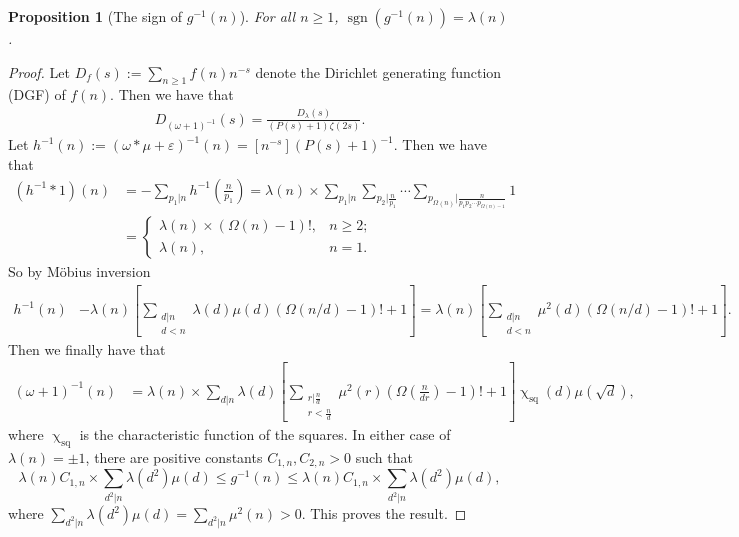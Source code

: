 \documentclass[11pt,reqno,a4letter]{article}
\numberwithin{figure}{section}
\numberwithin{table}{section}
\renewcommand{\chi}{\upchi}
\theoremstyle{plain}
\newtheorem{prop}[theorem]{Proposition}
\numberwithin{theorem}{section}
\theoremstyle{definition}
\begin{document}
\begin{prop}[The sign of $g^{-1}(n)$]
\label{prop_SignageDirInvsOfPosBddArithmeticFuncs_v1} 
For all $n \geq 1$, $\operatorname{sgn}(g^{-1}(n)) = \lambda(n)$. 
\end{prop} 
\begin{proof} 
Let $D_f(s) := \sum_{n \geq 1} f(n) n^{-s}$ denote the Dirichlet generating function (DGF) of $f(n)$. 
Then we have that 
\begin{align*} 
D_{(\omega+1)^{-1}}(s) = \frac{D_{\lambda}(s)}{(P(s)+1) \zeta(2s)}. 
\end{align*} 
Let $h^{-1}(n) := (\omega \ast \mu + \varepsilon)^{-1}(n) = [n^{-s}](P(s) + 1)^{-1}$. 
Then we have that 
\begin{align*} 
(h^{-1} \ast 1)(n) & = - \sum_{p_1|n} h^{-1}\left(\frac{n}{p_1}\right) 
     = \lambda(n) \times \sum_{p_1|n} \sum_{p_2|\frac{n}{p_1}} \cdots \sum_{p_{\Omega(n)} | 
     \frac{n}{p_1p_2\cdots p_{\Omega(n)-1}}} 1 \\ 
     & = \begin{cases} 
     \lambda(n) \times (\Omega(n) - 1)!, & n \geq 2; \\ 
     \lambda(n), & n=1. 
     \end{cases} 
\end{align*} 
So by M\"obius inversion 
\begin{align*} 
h^{-1}(n) & - \lambda(n) \left[\sum_{\substack{d|n \\ d<n}} \lambda(d) \mu(d) (\Omega(n/d)-1)! + 1\right] 
     = \lambda(n) \left[\sum_{\substack{d|n \\ d<n}} \mu^2(d) (\Omega(n/d)-1)! + 1\right]. 
\end{align*} 
Then we finally have that 
\begin{align*} 
(\omega+1)^{-1}(n) & = \lambda(n) \times \sum_{d|n} \lambda(d) 
     \left[\sum_{\substack{r|\frac{n}{d} \\ r < \frac{n}{d}}}  \mu^2(r) (\Omega\left(\frac{n}{dr}\right)-1)!+ 1\right] 
     \chi_{\operatorname{sq}}(d) \mu(\sqrt{d}), 
\end{align*} 
where $\chi_{\operatorname{sq}}$ is the characteristic function of the squares. 
In either case of $\lambda(n) = \pm 1$, there are positive constants $C_{1,n},C_{2,n} > 0$ such that 
\[
\lambda(n) C_{1,n} \times \sum_{d^2|n} \lambda(d^2) \mu(d) \leq g^{-1}(n) \leq 
     \lambda(n) C_{1,n} \times \sum_{d^2|n} \lambda(d^2) \mu(d), 
\]
where $\sum_{d^2|n} \lambda(d^2) \mu(d) = \sum_{d^2|n} \mu^2(n) > 0$. 
This proves the result. 
\end{proof} 
\end{document}
